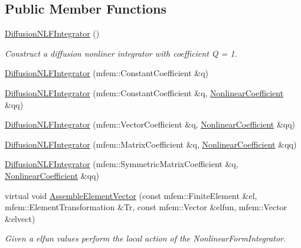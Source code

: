 \subsection*{Public Member Functions}
\begin{DoxyCompactItemize}
\item 
\mbox{\label{classDiffusionNLFIntegrator_aa5ac1c68c41c380ae93cae393f7d6f58}} 
\hyperlink{classDiffusionNLFIntegrator_aa5ac1c68c41c380ae93cae393f7d6f58}{Diffusion\+N\+L\+F\+Integrator} ()
\begin{DoxyCompactList}\small\item\em Construct a diffusion nonliner integrator with coefficient Q = 1. \end{DoxyCompactList}\item 
\hyperlink{classDiffusionNLFIntegrator_afca901531276e09a8422f49feb21f8e8}{Diffusion\+N\+L\+F\+Integrator} (mfem\+::\+Constant\+Coefficient \&q)
\item 
\hyperlink{classDiffusionNLFIntegrator_ab36835fb8a4338e17d34e06fb78eefdb}{Diffusion\+N\+L\+F\+Integrator} (mfem\+::\+Constant\+Coefficient \&q, \hyperlink{classNonlinearCoefficient}{Nonlinear\+Coefficient} \&qq)
\item 
\hyperlink{classDiffusionNLFIntegrator_a8ac2d40eeb337b5e583af9aa507b3f79}{Diffusion\+N\+L\+F\+Integrator} (mfem\+::\+Vector\+Coefficient \&q, \hyperlink{classNonlinearCoefficient}{Nonlinear\+Coefficient} \&qq)
\item 
\hyperlink{classDiffusionNLFIntegrator_a12fc3a8e2a499ca7751d570df106bcf3}{Diffusion\+N\+L\+F\+Integrator} (mfem\+::\+Matrix\+Coefficient \&q, \hyperlink{classNonlinearCoefficient}{Nonlinear\+Coefficient} \&qq)
\item 
\hyperlink{classDiffusionNLFIntegrator_adcfdeb40ded7183d014271e67dd767b5}{Diffusion\+N\+L\+F\+Integrator} (mfem\+::\+Symmetric\+Matrix\+Coefficient \&q, \hyperlink{classNonlinearCoefficient}{Nonlinear\+Coefficient} \&qq)
\item 
\mbox{\label{classDiffusionNLFIntegrator_acce6dfc2efb977559c9dcc75f12dcb22}} 
virtual void \hyperlink{classDiffusionNLFIntegrator_acce6dfc2efb977559c9dcc75f12dcb22}{Assemble\+Element\+Vector} (const mfem\+::\+Finite\+Element \&el, mfem\+::\+Element\+Transformation \&Tr, const mfem\+::\+Vector \&elfun, mfem\+::\+Vector \&elvect)
\begin{DoxyCompactList}\small\item\em Given a elfun values perform the local action of the Nonlinear\+Form\+Integrator. \end{DoxyCompactList}\item 

\end{DoxyCompactItemize}
